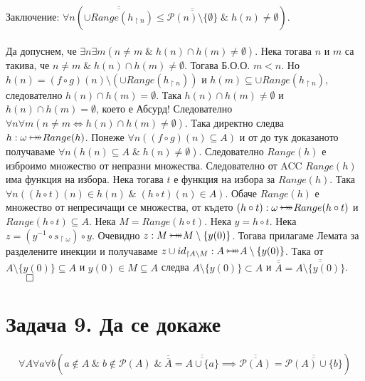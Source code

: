 \documentclass[12pt]{article}
\newcommand{\bijection}[0]{\mathbin{\mathlarger{\mathlarger{\rightarrowtail}} \hspace{-14pt} \mathlarger{\mathlarger{\twoheadrightarrow}}}}
\begin{document}
\vspace{1mm}
\\
Заключение:
\(\forall n (\overline{\overline{\cup Range(h_{\restriction n}) }} \leq \overline{\overline{\mathcal{P}(n) \setminus \{\emptyset\}}} \; \& \; h(n) \neq \emptyset)\).
\\
\vspace{1mm}
\\
Да допуснем, че \(\exists n \exists m (n \neq m \; \& \; h(n) \cap h(m) \neq \emptyset)\).
Нека тогава \(n\) и \(m\) са такива, че
\(n \neq m \; \& \; h(n) \cap h(m) \neq \emptyset\).
Тогава Б.О.О. \(m < n\).
Но \(h(n) = (f \circ g)(n) \setminus (\cup Range(h_{\restriction n}))\)
и \(h(m) \subseteq \cup Range(h_{\restriction n})\),
следователно \(h(n) \cap h(m) = \emptyset\).
Така \(h(n) \cap h(m) \neq \emptyset\) и \(h(n) \cap h(m) = \emptyset\),
което е Абсурд! Следователно
\(\forall n \forall m (n \neq m \iff h(n) \cap h(m) \neq \emptyset)\).
Така директно следва \(h : \omega \bijection Range(h)\).
Понеже \(\forall n ((f \circ g)(n) \subseteq A)\) и от до тук доказаното получаваме
\(\forall n (h(n) \subseteq A \; \& \; h(n) \neq \emptyset)\).
Следователно \(Range(h)\) е изброимо множество от непразни множества.
Следователно от ACC \(Range(h)\) има функция на избора.
Нека тогава \(t\) е функция на избора за \(Range(h)\).
Така \(\forall n ((h \circ t)(n) \in h(n) \; \& \; (h \circ t)(n) \in A)\).
Обаче \(Range(h)\) е множество от непресичащи се множества,
от където \((h \circ t) : \omega \bijection Range(h \circ t)\)
и \(Range(h \circ t) \subseteq A\).
Нека \(M = Range(h \circ t)\).
Нека \(y = h \circ t\).
Нека \(z = (y^{-1} \circ s_{\restriction \omega}) \circ y\).
Очевидно \(z : M \bijection M \setminus \{y(0)\}\).
Тогава прилагаме Лемата за разделените инекции
и получаваме \(z \cup id_{\restriction A \setminus M} : A \bijection A \setminus \{y(0)\}\).
Така от \(A \setminus \{y(0)\} \subseteq A\) и \(y(0) \in M \subseteq A\)
следва \(A \setminus \{y(0)\} \subset A\) и \(\overline{\overline{A}} = \overline{\overline{A \setminus \{y(0)\}}}\).
\(\qed\)

\section*{Задача 9. Да се докаже}
\begin{align*}
\forall A \forall a \forall b (a \notin A \; \& \; b \notin \mathcal{P}(A) \; \& \; \overline{\overline{A}} = \overline{\overline{A \cup \{a\}}}
\implies \overline{\overline{\mathcal{P}(A)}} = \overline{\overline{\mathcal{P}(A) \cup \{b\}}})
\end{align*}
\end{document}
